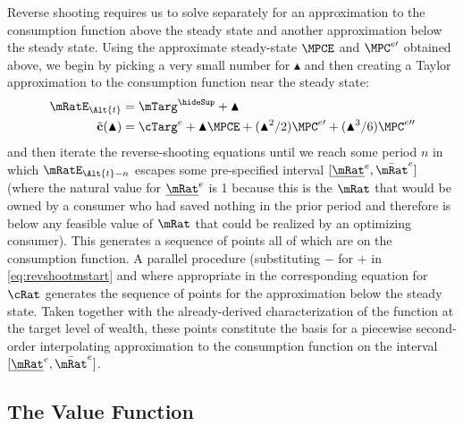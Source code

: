 \documentclass{\handout}
\begin{document}
Reverse shooting requires us to solve separately for an approximation to the consumption function above the steady state and 
another approximation below the steady state.  Using the approximate steady-state $\MPCE$ and $\MPC^{e\prime}$ 
obtained above, we begin by picking a very small number for $\blacktriangle$ and then creating a Taylor
approximation to the consumption function near the steady state:
\begin{equation}\begin{gathered}\begin{aligned}
  \mRatE_{\Alt{t}} & = \mTarg^{\hideSup} + \blacktriangle  \label{eq:revshootmstart} 
\\ \tilde{\mathbf{c}}(\blacktriangle) & = \cTarg^{e} + \blacktriangle \MPCE+ (\blacktriangle^{2}/2) \MPC^{e\prime}+ (\blacktriangle^{3}/6) \MPC^{e\prime\prime} \notag %
\end{aligned}\end{gathered}\end{equation}
and then iterate the reverse-shooting equations until we reach some period $n$ in
which $\mRatE_{\Alt{t}-n}$ escapes some pre-specified interval $[\underline{\mRat}^{e},\bar{\mRat}^{e}]$ (where the natural 
value for $\underline{\mRat}^{e}$ is 1 because this is the $\mRat$ that would be owned by a consumer who had saved
nothing in the prior period and therefore is below any feasible value of $\mRat$ that could be realized by an 
optimizing consumer).  This generates a sequence of points all of which
are on the consumption function.  A parallel procedure (substituting $-$ for
$+$ in \eqref{eq:revshootmstart} and where appropriate in %
the corresponding equation for $\cRat$ generates the sequence of points for the approximation below the 
steady state.  Taken together with the already-derived characterization of the function
at the target level of wealth, these points constitute the basis for a piecewise second-order interpolating approximation to the
consumption function on the interval $[\underline{\mRat}^{e},\bar{\mRat}^{e}]$.

\subsection{The Value Function}
\end{document}
